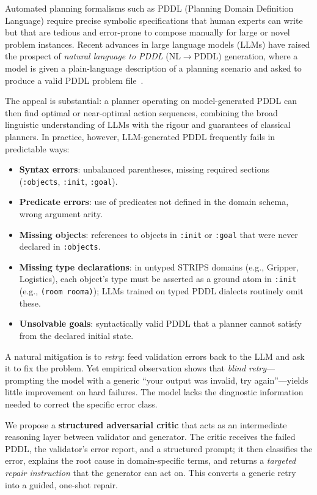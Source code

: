 \documentclass{article}
\begin{document}
Automated planning formalisms such as PDDL (Planning Domain Definition Language)
require precise symbolic specifications that human experts can write but that are
tedious and error-prone to compose manually for large or novel problem instances.
Recent advances in large language models (LLMs) have raised the prospect of
\emph{natural language to PDDL} (NL$\to$PDDL) generation, where a model is given
a plain-language description of a planning scenario and asked to produce a valid
PDDL problem file~\cite{guo2023pddl,liu2023llm+p}.

The appeal is substantial: a planner operating on model-generated PDDL can then find
optimal or near-optimal action sequences, combining the broad linguistic understanding
of LLMs with the rigour and guarantees of classical planners.  In practice, however,
LLM-generated PDDL frequently fails in predictable ways:

\begin{itemize}[leftmargin=1.5em]
  \item \textbf{Syntax errors}: unbalanced parentheses, missing required sections
        (\texttt{:objects}, \texttt{:init}, \texttt{:goal}).
  \item \textbf{Predicate errors}: use of predicates not defined in the domain schema,
        wrong argument arity.
  \item \textbf{Missing objects}: references to objects in \texttt{:init} or \texttt{:goal}
        that were never declared in \texttt{:objects}.
  \item \textbf{Missing type declarations}: in untyped STRIPS domains (e.g., Gripper,
        Logistics), each object's type must be asserted as a ground atom in \texttt{:init}
        (e.g., \texttt{(room rooma)}); LLMs trained on typed PDDL dialects routinely
        omit these.
  \item \textbf{Unsolvable goals}: syntactically valid PDDL that a planner cannot satisfy
        from the declared initial state.
\end{itemize}

A natural mitigation is to \emph{retry}: feed validation errors back to the LLM and
ask it to fix the problem.  Yet empirical observation shows that \emph{blind retry}---
prompting the model with a generic ``your output was invalid, try again''---yields
little improvement on hard failures.  The model lacks the diagnostic information
needed to correct the specific error class.

We propose a \textbf{structured adversarial critic} that acts as an intermediate reasoning
layer between validator and generator.  The critic receives the failed PDDL, the
validator's error report, and a structured prompt; it then classifies the error,
explains the root cause in domain-specific terms, and returns a \emph{targeted repair
instruction} that the generator can act on.  This converts a generic retry into a
guided, one-shot repair.
\end{document}
